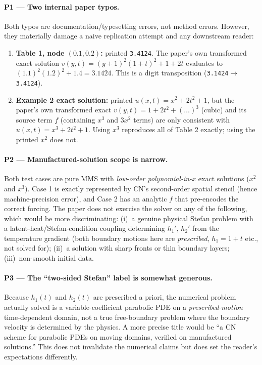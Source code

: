 \documentclass[11pt]{article}
\begin{document}
\paragraph{P1 --- Two internal paper typos.}
Both typos are documentation/typesetting errors, not method errors. However,
they materially damage a naive replication attempt and any downstream reader:
\begin{enumerate}
  \item \textbf{Table 1, node $(0.1,0.2)$:} printed \texttt{3.4124}. The paper's
        own transformed exact solution
        $v(y,t)=(y+1)^{2}(1+t)^{2}+1+2t$ evaluates to
        $(1.1)^{2}(1.2)^{2}+1.4 = 3.1424$. This is a digit transposition
        (\texttt{3.1424}$\to$\texttt{3.4124}).
  \item \textbf{Example 2 exact solution:} printed $u(x,t)=x^{2}+2t^{2}+1$, but
        the paper's own transformed exact
        $v(y,t)=1+2t^{2}+(\ldots)^{3}$ (cubic) and its source term $f$
        (containing $x^{3}$ and $3x^{2}$ terms) are only consistent with
        $u(x,t)=x^{3}+2t^{2}+1$. Using $x^{3}$ reproduces all of Table 2
        exactly; using the printed $x^{2}$ does not.
\end{enumerate}

\paragraph{P2 --- Manufactured-solution scope is narrow.}
Both test cases are pure MMS with \emph{low-order polynomial-in-$x$} exact
solutions ($x^{2}$ and $x^{3}$). Case 1 is exactly represented by CN's
second-order spatial stencil (hence machine-precision error), and Case 2 has an
analytic $f$ that pre-encodes the correct forcing. The paper does not exercise
the solver on any of the following, which would be more discriminating:
(i)~a genuine physical Stefan problem with a latent-heat/Stefan-condition
coupling determining $h_1'$, $h_2'$ from the temperature gradient (both boundary
motions here are \emph{prescribed}, $h_1=1+t$ etc., not solved for);
(ii)~a solution with sharp fronts or thin boundary layers;
(iii)~non-smooth initial data.

\paragraph{P3 --- The ``two-sided Stefan'' label is somewhat generous.}
Because $h_1(t)$ and $h_2(t)$ are prescribed a priori, the numerical problem
actually solved is a variable-coefficient parabolic PDE on a
\emph{prescribed-motion} time-dependent domain, not a true free-boundary problem
where the boundary velocity is determined by the physics. A more precise title
would be ``a CN scheme for parabolic PDEs on moving domains, verified on
manufactured solutions.'' This does not invalidate the numerical claims but
does set the reader's expectations differently.
\end{document}
